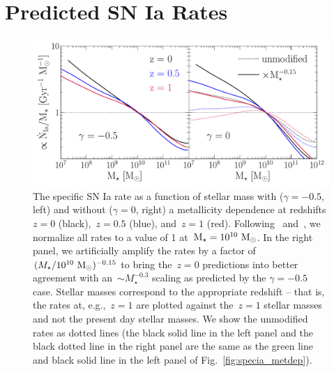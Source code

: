 \documentclass[ms.tex]{subfiles}
\begin{document}
\section{Predicted SN Ia Rates}
\label{sec:predictions}

\begin{figure}
\centering
\includegraphics[scale = 0.56]{umachine_iarate_redshiftevol.pdf}
\caption{
The specific SN Ia rate as a function of stellar mass with ($\gamma = -0.5$,
left) and without ($\gamma = 0$, right) a metallicity dependence at redshifts
$z = 0$ (black),~$z = 0.5$ (blue), and~$z = 1$ (red).
Following~\citet{Brown2019} and~\citet{Gandhi2022}, we normalize all rates to
a value of 1 at~$\text{M}_\star = 10^{10}~\text{M}_\odot$.
In the right panel, we artificially amplify the rates by a factor of
$(M_\star / 10^{10}~\text{M}_\odot)^{-0.15}$ to bring the~$z = 0$ predictions into
better agreement with an~$\sim M_\star^{-0.3}$ scaling as predicted by the
$\gamma = -0.5$ case.
Stellar masses correspond to the appropriate redshift -- that is, the rates at,
e.g.,~$z = 1$ are plotted against the~$z = 1$ stellar masses and not the
present day stellar masses.
We show the unmodified rates as dotted lines (the black solid line in the left
panel and the black dotted line in the right panel are the same as the green
line and black solid line in the left panel of Fig.~\ref{fig:specia_metdep}).
}
\label{fig:specia_zdep}
\end{figure}
\end{document}
